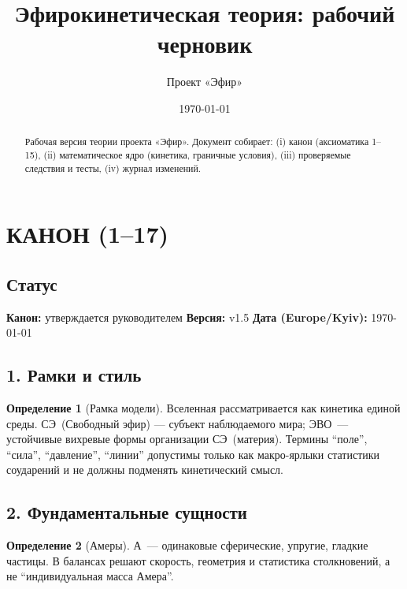 \documentclass[12pt]{article}
\title{Эфирокинетическая теория: рабочий черновик}
\author{Проект «Эфир»}
\date{\today}
\newcommand{\SE}{\mbox{\textsc{СЭ}}}
\newcommand{\EVO}{\mbox{\textsc{ЭВО}}}
\newcommand{\A}{\mbox{\textsc{А}}} %
\theoremstyle{definition}
\newtheorem{definition}{Определение}[section]
\theoremstyle{plain}
\theoremstyle{remark}
\begin{document}
\maketitle

\begin{abstract}
Рабочая версия теории проекта «Эфир». Документ собирает: (i) канон (аксиоматика 1--15),
(ii) математическое ядро (кинетика, граничные условия), (iii) проверяемые следствия и тесты,
(iv) журнал изменений.
\end{abstract}

\tableofcontents
\bigskip

\section{КАНОН (1--17)}
\subsection*{Статус}
\textbf{Канон:} утверждается руководителем \quad
\textbf{Версия:} v1.5 \quad
\textbf{Дата (Europe/Kyiv):} \today

\subsection{1. Рамки и стиль}
\begin{definition}[Рамка модели]
Вселенная рассматривается как кинетика единой среды. \SE\ (Свободный эфир) — субъект наблюдаемого мира;
\EVO\ — устойчивые вихревые формы организации \SE\ (материя).
Термины ``поле'', ``сила'', ``давление'', ``линии'' допустимы только как макро-ярлыки статистики соударений
и не должны подменять кинетический смысл.
\end{definition}

\subsection{2. Фундаментальные сущности}
\begin{definition}[Амеры]
\A\ — одинаковые сферические, упругие, гладкие частицы. В балансах решают скорость, геометрия и статистика столкновений,
а не ``индивидуальная масса Амера''.
\end{definition}

\end{document}
